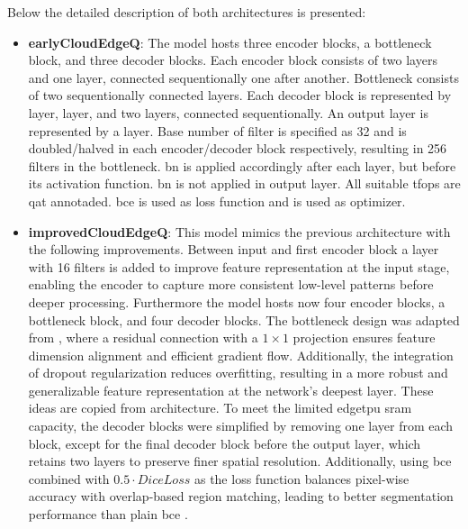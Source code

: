 {Below the detailed description of both architectures is presented:
\begin{itemize}
    \item \textbf{earlyCloudEdgeQ}: The model hosts three encoder blocks, a bottleneck block, and three decoder blocks.
    Each encoder block consists of two  layers and one  layer,
    connected sequentionally one after another. Bottleneck consists of two sequentionally connected  layers.
    Each decoder block is represented by  layer,  layer, and two  layers,
    connected sequentionally. An output layer is represented by a  layer.
    Base number of filter is specified as 32 and is doubled/halved in each encoder/decoder block respectively, resulting in 256 filters in the bottleneck.
    \gls{bn} is applied accordingly after each  layer, but before its activation function. \gls{bn} is not applied in output layer.
    All suitable \glspl{tfop} are \gls{qat} annotaded. \gls{bce} is used as loss function and  is used as optimizer.
    \item \textbf{improvedCloudEdgeQ}: This model mimics the previous architecture with the following improvements.
    Between input and first encoder block a  layer with 16 filters is added to improve feature representation at the input stage,
    enabling the encoder to capture more consistent low-level patterns before deeper processing.
    Furthermore the model hosts now four encoder blocks, a bottleneck block, and four decoder blocks. The bottleneck design was adapted from ,
    where a residual connection with a $1\times1$ projection ensures feature dimension alignment and efficient gradient flow. Additionally,
    the integration of dropout regularization reduces overfitting, resulting in a more robust and generalizable feature representation at the network's deepest layer.
    These ideas are copied from  architecture.
    To meet the limited \gls{edgetpu} \gls{sram} capacity, the decoder blocks were simplified by removing one  layer from each block,
    except for the final decoder block before the output layer, which retains two  layers to preserve finer spatial resolution.
    Additionally, using \gls{bce} combined with \ensuremath{0.5 \cdot DiceLoss} as the loss function balances pixel-wise accuracy with overlap-based region matching,
    leading to better segmentation performance than plain \gls{bce} \cite{bcedice1, bcedice2}.


\end{itemize}}
